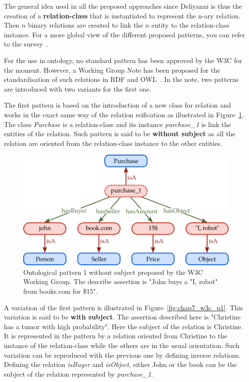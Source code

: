 The general idea used in all the proposed approaches since Deliyanni is thus the creation of a \textbf{relation-class} that is instantiated to represent the n-ary relation. Then $n$ binary relations are created to link the $n$ entity to the relation-class instance. For a more global view of the different proposed patterns, you can refer to the survey~\cite{gangemi_2013_multi}.

For the use in ontology, no standard pattern has been approved by the W3C for the moment. However, a Working Group Note has been proposed for the standardisation of such relations in RDF and OWL~\cite{w3c_2006_defining}. In the note, two patterns are introduced with two variants for the first one.

The first pattern is based on the introduction of a new class for relation and works in the exact same way of the relation reification as illustrated in Figure~\ref{fig:chap7_w3c_p2}. The class \textit{Purchase} is a relation-class and its instance \textit{purchase\_1} is link the entities of the relation. Such pattern is said to be \textbf{without subject} as all the relation are oriented from the relation-class instance to the other entities.

\begin{figure}[ht!]
\centering
\includegraphics[scale=0.4]{figures/chapter7/w3c_p2.png}
\caption{\label{fig:chap7_w3c_p2} Ontological pattern 1 without subject proposed by the W3C Working Group. The describe assertion is "John buys a "I, robot" from books.com for \$15".}
\end{figure}

A variation of the first pattern is illustrated in Figure~\ref{fig:chap7_w3c_p1}. This variation is said to be \textbf{with subject}. The assertion described here is "Christine has a tumor with high probability". Here the subject of the relation is Christine. It is represented in the pattern by a relation oriented from Christine to the instance of the relation-class while the others are in the usual orientation. Such variation can be reproduced with the previous one by defining inverse relations. Defining the relation \textit{isBuyer} and \textit{isObject}, either John or the book can be the subject of the relation represented by \textit{purchase\_1}.

